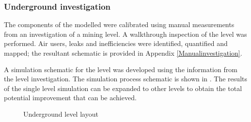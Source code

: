 	\subsubsection{Underground investigation}
	The components of the modelled were calibrated using manual measurements from an investigation of a mining level. A walkthrough inspection of the level was performed. Air users, leaks and inefficiencies were identified, quantified and mapped; the resultant schematic is provided in Appendix \ref{Manualinvestigation}.
	\par 
	A simulation schematic for the level was developed using the information from the level investigation. The simulation process schematic is shown in . The results of the single level simulation can be expanded to other levels to obtain the total potential improvement that can be achieved.
	\begin{figure}[h!]
		\centering
		\caption{Underground level layout}
		\label{fig: KUS Simulation level layout}
	\end{figure}	
	\clearpage
